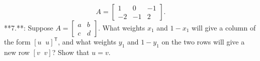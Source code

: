 \[A=\left[\begin{matrix}1&0&-1\\ -2&-1&2\end{matrix}\right].\]
**7.**: Suppose \(A=\left[\begin{smallmatrix}a&b\\ c&d\end{smallmatrix}\right]\). What weights \(x_{1}\) and \(1-x_{1}\) will give a column of the form \([u\;\;u]^{\mathsf{T}}\), and what weights \(y_{1}\) and \(1-y_{1}\) on the two rows will give a new row \([v\;\;v]\)? Show that \(u=v\).

 